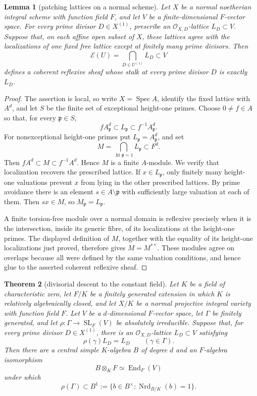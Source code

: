 \documentclass[11pt,reqno]{amsart}
\newtheorem{theorem}{Theorem}[section]
\newtheorem{lemma}[theorem]{Lemma}
\theoremstyle{definition}
\theoremstyle{remark}
\newcommand{\cO}{\mathcal O}
\newcommand{\SL}{\operatorname{SL}}
\newcommand{\End}{\operatorname{End}}
\begin{document}
\begin{lemma}[patching lattices on a normal scheme]
\label{lem:reflexive-lattice-patching}
Let \(X\) be a normal noetherian integral scheme with function field \(F\),
and let \(V\) be a finite-dimensional \(F\)-vector space.  For every prime
divisor \(D\in X^{(1)}\), prescribe an
\(\mathcal O_{X,D}\)-lattice \(L_D\subset V\).  Suppose that, on each affine
open subset of \(X\), these lattices agree with the localizations of one
fixed free lattice except at finitely many prime divisors.  Then
\[
 \mathcal E(U)=\bigcap_{D\in U^{(1)}}L_D\subset V
\]
defines a coherent reflexive sheaf whose stalk at every prime divisor \(D\)
is exactly \(L_D\).
\end{lemma}

\begin{proof}
The assertion is local, so write \(X=\operatorname{Spec}A\), identify the
fixed lattice with \(A^d\), and let \(S\) be the finite set of exceptional
height-one primes.  Choose \(0\ne f\in A\) so that, for every
\(\mathfrak p\in S\),
\[
 fA_{\mathfrak p}^d\subset L_{\mathfrak p}
       \subset f^{-1}A_{\mathfrak p}^d.
\]
For nonexceptional height-one primes put
\(L_{\mathfrak p}=A_{\mathfrak p}^d\), and set
\[
 M=\bigcap_{\operatorname{ht}\mathfrak p=1}L_{\mathfrak p}\subset F^d.
\]
Then \(fA^d\subset M\subset f^{-1}A^d\).  Hence \(M\) is a finite
\(A\)-module.  We verify that localization recovers the prescribed lattice.
If \(x\in L_{\mathfrak p}\), only finitely many height-one valuations prevent
\(x\) from lying in the other prescribed lattices.  By prime avoidance there
is an element \(s\in A\setminus\mathfrak p\) with
sufficiently large valuation at each of them.  Then \(sx\in M\), so
\(M_{\mathfrak p}=L_{\mathfrak p}\).

A finite torsion-free module over a normal domain is reflexive precisely
when it is the intersection, inside its generic fibre, of its localizations
at the height-one primes.  The displayed definition of \(M\), together with
the equality of its height-one localizations just proved, therefore gives
\(M=M^{**}\).  These modules agree on overlaps because all were defined by
the same valuation conditions, and hence glue to the asserted coherent
reflexive sheaf.
\end{proof}

\begin{theorem}[divisorial descent to the constant field]
\label{thm:constant-field-descent}
Let \(K\) be a field of characteristic zero, let \(F/K\) be a finitely
generated extension in which \(K\) is relatively algebraically closed, and
let \(X/K\) be a normal projective integral variety with function field
\(F\).  Let \(V\) be a \(d\)-dimensional \(F\)-vector space, let
\(\Gamma\) be finitely generated, and let
\(\rho\colon\Gamma\to\SL_F(V)\) be absolutely irreducible.  Suppose that,
for every prime divisor \(D\in X^{(1)}\), there is an
\(\cO_{X,D}\)-lattice \(L_D\subset V\) satisfying
\[
 \rho(\gamma)L_D=L_D\qquad(\gamma\in\Gamma).
\]
Then there are a central simple \(K\)-algebra \(B\) of degree \(d\) and an
\(F\)-algebra isomorphism
\[
 B\otimes_KF\simeq\End_F(V)
\]
under which
\[
 \rho(\Gamma)\subset
 B^1:=\{b\in B^\times:\operatorname{Nrd}_{B/K}(b)=1\}.
\]
\end{theorem}
\end{document}
